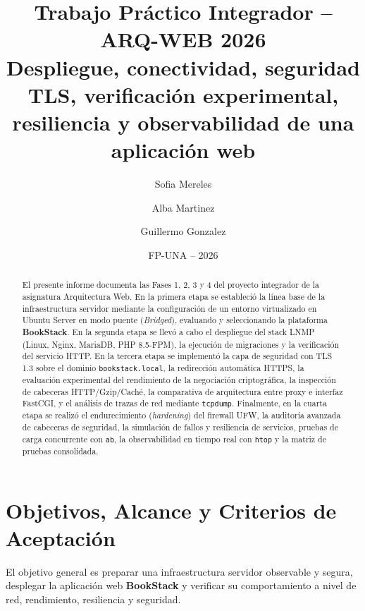 \documentclass[12pt,a4paper]{article}
\title{\textbf{Trabajo Práctico Integrador -- ARQ-WEB 2026}\\Despliegue, conectividad, seguridad TLS, verificación experimental, resiliencia y observabilidad de una aplicación web}
\author{Sofia Mereles \and Alba Martinez \and Guillermo Gonzalez}
\date{FP-UNA -- 2026}
\begin{document}
\maketitle

\begin{abstract}
El presente informe documenta las Fases 1, 2, 3 y 4 del proyecto integrador de la asignatura Arquitectura Web. En la primera etapa se estableció la línea base de la infraestructura servidor mediante la configuración de un entorno virtualizado en Ubuntu Server en modo puente (\textit{Bridged}), evaluando y seleccionando la plataforma \textbf{BookStack}. En la segunda etapa se llevó a cabo el despliegue del stack LNMP (Linux, Nginx, MariaDB, PHP 8.5-FPM), la ejecución de migraciones y la verificación del servicio HTTP. En la tercera etapa se implementó la capa de seguridad con TLS 1.3 sobre el dominio \texttt{bookstack.local}, la redirección automática HTTPS, la evaluación experimental del rendimiento de la negociación criptográfica, la inspección de cabeceras HTTP/Gzip/Caché, la comparativa de arquitectura entre proxy e interfaz FastCGI, y el análisis de trazas de red mediante \texttt{tcpdump}. Finalmente, en la cuarta etapa se realizó el endurecimiento (\textit{hardening}) del firewall UFW, la auditoría avanzada de cabeceras de seguridad, la simulación de fallos y resiliencia de servicios, pruebas de carga concurrente con \texttt{ab}, la observabilidad en tiempo real con \texttt{htop} y la matriz de pruebas consolidada.
\end{abstract}

\tableofcontents
\newpage

\section{Objetivos, Alcance y Criterios de Aceptación}
El objetivo general es preparar una infraestructura servidor observable y segura, desplegar la aplicación web \textbf{BookStack} y verificar su comportamiento a nivel de red, rendimiento, resiliencia y seguridad.
\end{document}
